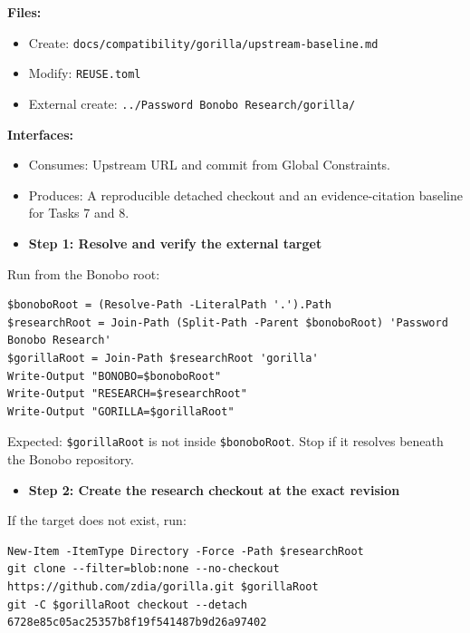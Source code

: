 \documentclass[
  letterpaper,
]{article}
\newcommand{\passthrough}[1]{#1}
\providecommand{\tightlist}{%
  \setlength{\itemsep}{0pt}\setlength{\parskip}{0pt}}
\begin{document}
\textbf{Files:}

\begin{itemize}
\tightlist
\item
  Create: \nolinkurl{docs/compatibility/gorilla/upstream-baseline.md}
\item
  Modify: \nolinkurl{REUSE.toml}
\item
  External create: \passthrough{\lstinline!../Password Bonobo Research/gorilla/!}
\end{itemize}

\textbf{Interfaces:}

\begin{itemize}
\tightlist
\item
  Consumes: Upstream URL and commit from Global Constraints.
\item
  Produces: A reproducible detached checkout and an evidence-citation baseline for Tasks 7 and 8.
\end{itemize}

\begin{itemize}
\tightlist
\item[$\boxtimes$]
  \textbf{Step 1: Resolve and verify the external target}
\end{itemize}

Run from the Bonobo root:

\begin{lstlisting}
$bonoboRoot = (Resolve-Path -LiteralPath '.').Path
$researchRoot = Join-Path (Split-Path -Parent $bonoboRoot) 'Password Bonobo Research'
$gorillaRoot = Join-Path $researchRoot 'gorilla'
Write-Output "BONOBO=$bonoboRoot"
Write-Output "RESEARCH=$researchRoot"
Write-Output "GORILLA=$gorillaRoot"
\end{lstlisting}

Expected: \nolinkurl{$gorillaRoot} is not inside \nolinkurl{$bonoboRoot}. Stop if it resolves beneath the Bonobo
repository.

\begin{itemize}
\tightlist
\item[$\boxtimes$]
  \textbf{Step 2: Create the research checkout at the exact revision}
\end{itemize}

If the target does not exist, run:

\begin{lstlisting}
New-Item -ItemType Directory -Force -Path $researchRoot
git clone --filter=blob:none --no-checkout https://github.com/zdia/gorilla.git $gorillaRoot
git -C $gorillaRoot checkout --detach 6728e85c05ac25357b8f19f541487b9d26a97402
\end{lstlisting}
\end{document}
